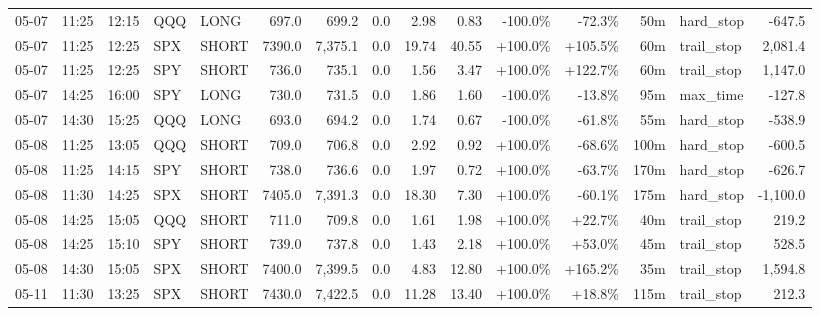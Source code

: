 \documentclass[11pt,a4paper,twoside]{article}
\begin{document}
\begin{landscape}
\begin{center}
\begin{longtable}{>{\color{txtmain}}l l l l l r r r r r r r r >{\color{txtmain}}l r}
05-07 & 11:25 & 12:15 & QQQ & LONG & 697.0 & 699.2 & 0.0 & 2.98 & 0.83 & \textcolor{lossred}{-100.0\%} & \textcolor{lossred}{-72.3\%} & 50m & hard\_stop & \textcolor{lossred}{-647.5} \\
05-07 & 11:25 & 12:25 & SPX & SHORT & 7390.0 & 7,375.1 & 0.0 & 19.74 & 40.55 & \textcolor{wingreen}{+100.0\%} & \textcolor{wingreen}{+105.5\%} & 60m & trail\_stop & \textcolor{wingreen}{2,081.4} \\
05-07 & 11:25 & 12:25 & SPY & SHORT & 736.0 & 735.1 & 0.0 & 1.56 & 3.47 & \textcolor{wingreen}{+100.0\%} & \textcolor{wingreen}{+122.7\%} & 60m & trail\_stop & \textcolor{wingreen}{1,147.0} \\
05-07 & 14:25 & 16:00 & SPY & LONG & 730.0 & 731.5 & 0.0 & 1.86 & 1.60 & \textcolor{lossred}{-100.0\%} & \textcolor{lossred}{-13.8\%} & 95m & max\_time & \textcolor{lossred}{-127.8} \\
05-07 & 14:30 & 15:25 & QQQ & LONG & 693.0 & 694.2 & 0.0 & 1.74 & 0.67 & \textcolor{lossred}{-100.0\%} & \textcolor{lossred}{-61.8\%} & 55m & hard\_stop & \textcolor{lossred}{-538.9} \\
05-08 & 11:25 & 13:05 & QQQ & SHORT & 709.0 & 706.8 & 0.0 & 2.92 & 0.92 & \textcolor{wingreen}{+100.0\%} & \textcolor{lossred}{-68.6\%} & 100m & hard\_stop & \textcolor{lossred}{-600.5} \\
05-08 & 11:25 & 14:15 & SPY & SHORT & 738.0 & 736.6 & 0.0 & 1.97 & 0.72 & \textcolor{wingreen}{+100.0\%} & \textcolor{lossred}{-63.7\%} & 170m & hard\_stop & \textcolor{lossred}{-626.7} \\
05-08 & 11:30 & 14:25 & SPX & SHORT & 7405.0 & 7,391.3 & 0.0 & 18.30 & 7.30 & \textcolor{wingreen}{+100.0\%} & \textcolor{lossred}{-60.1\%} & 175m & hard\_stop & \textcolor{lossred}{-1,100.0} \\
05-08 & 14:25 & 15:05 & QQQ & SHORT & 711.0 & 709.8 & 0.0 & 1.61 & 1.98 & \textcolor{wingreen}{+100.0\%} & \textcolor{wingreen}{+22.7\%} & 40m & trail\_stop & \textcolor{wingreen}{219.2} \\
05-08 & 14:25 & 15:10 & SPY & SHORT & 739.0 & 737.8 & 0.0 & 1.43 & 2.18 & \textcolor{wingreen}{+100.0\%} & \textcolor{wingreen}{+53.0\%} & 45m & trail\_stop & \textcolor{wingreen}{528.5} \\
05-08 & 14:30 & 15:05 & SPX & SHORT & 7400.0 & 7,399.5 & 0.0 & 4.83 & 12.80 & \textcolor{wingreen}{+100.0\%} & \textcolor{wingreen}{+165.2\%} & 35m & trail\_stop & \textcolor{wingreen}{1,594.8} \\
05-11 & 11:30 & 13:25 & SPX & SHORT & 7430.0 & 7,422.5 & 0.0 & 11.28 & 13.40 & \textcolor{wingreen}{+100.0\%} & \textcolor{wingreen}{+18.8\%} & 115m & trail\_stop & \textcolor{wingreen}{212.3} \\

\end{longtable}
\end{center}
\end{landscape}
\end{document}
